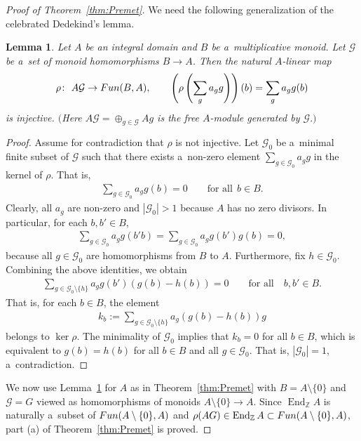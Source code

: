 \documentclass[11pt]{article}
\DeclareMathOperator{\End}{End}
\newtheorem{Lemma}[Theorem]{Lemma}
\begin{document}
\begin{proof}[Proof of Theorem~\ref{thm:Premet}]
We need the following generalization of the celebrated Dedekind's lemma.
\begin{Lemma}
\label{lem:dedekind}
Let $A$ be an integral domain and $B$ be a~multiplicative monoid.
Let $\mathcal G$ be a~set of monoid homomorphisms $B\to A$.
Then the natural $A$-linear map
\begin{gather*}
\rho\colon \ A\mathcal G \to {\rm Fun}(B,A),
\qquad
\left(\rho\left(\sum\limits_g a_g g\right)\right)(b) = \sum\limits_g a_g g(b)
\end{gather*}
is injective.
$($Here $A\mathcal G=\oplus_{g\in \mathcal G} Ag$ is the free $A$-module generated by $\mathcal G.)$
\end{Lemma}
\begin{proof}
Assume for contradiction that $\rho$ is not injective.
Let $\mathcal G _0$ be a~minimal f\/inite subset of $\mathcal G $ such that there exists a~non-zero element
$\sum\limits_{g\in \mathcal G _0}a_g g$ in the kernel of $\rho$.
That is,
\begin{gather*}
\sum\limits_{g\in \mathcal G _0}a_g g(b)=0
\qquad
\text{for all} \ \ b\in B.
\end{gather*}
Clearly, all $a_g$ are non-zero and $|\mathcal G _0|>1$ because $A$ has no zero divisors.
In particular, for each $b,b'\in B$,
\begin{gather*}
\sum\limits_{g\in \mathcal G _0} a_g g(b'b)=\sum\limits_{g\in \mathcal G _0} a_g g(b')g(b)=0,
\end{gather*}
because all $g\in \mathcal G _0$ are homomorphisms from $B$ to $A$.
Furthermore, f\/ix $h\in \mathcal G _0$.
Combining the above identities, we obtain
\begin{gather*}
\sum\limits_{g\in \mathcal G _0\setminus\{h\}} a_g g(b') (g(b) - h(b)) = 0
\qquad
\text{for all}\quad
b,b'\in B.
\end{gather*}
That is, for each $b\in B$, the element
\begin{gather*}
k_b:=\sum\limits_{g\in \mathcal G _0\setminus\{h\}} a_g (g(b) - h(b)) g
\end{gather*}
belongs to $\ker \rho$.
The minimality of $\mathcal G _0$ implies that $k_b=0$ for all $b\in B$, which is equivalent to $g(b)=h(b)$ for all
$b\in B$ and all $g\in \mathcal G _0$.
That is, $|\mathcal G _0|=1$, a~contradiction.
\end{proof}

We now use Lemma~\ref{lem:dedekind} for $A$ as in Theorem~\ref{thm:Premet} with $B=A\setminus\{0\}$ and $\mathcal G=G$
viewed as homomorphisms of monoids $A\setminus\{0\} \to A$.
Since $\End_\mathbb Z A$ is naturally a~subset of ${\rm Fun}(A\setminus\{0\},A)$ and $\rho(AG)\in \End_\mathbb Z
A\subset{\rm Fun}(A\setminus\{0\},A)$, part (a) of Theorem~\ref{thm:Premet} is proved.


\end{proof}
\end{document}
